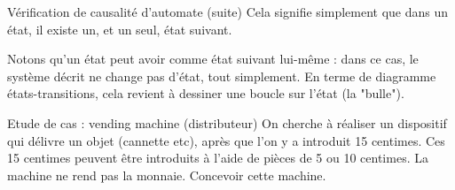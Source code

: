 \documentclass[xcolor=table]{beamer}
\begin{document}
\begin{frame}{Vérification de causalité d'automate (suite)}
  Cela signifie simplement que dans un état, il existe un, et un seul, état suivant.

  Notons qu'un état peut avoir comme état suivant lui-même : dans ce cas, le système décrit ne change pas d'état, tout simplement.
  En terme de diagramme états-transitions, cela revient à dessiner une boucle sur l'état (la "bulle").\\
\end{frame}

\begin{frame}{Etude de cas : vending machine (distributeur)}
  On cherche à réaliser un dispositif qui délivre un objet (cannette etc), après que l'on y a introduit 15 centimes.
  Ces 15 centimes peuvent être introduits à l'aide de pièces de 5 ou 10 centimes. La machine ne rend pas la monnaie.
  Concevoir cette machine.
\end{frame}
\end{document}
